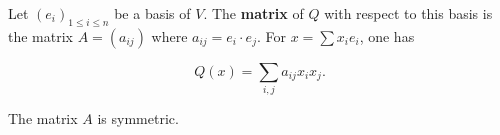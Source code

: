 Let $(e_i)_{1 \le i \le n}$ be a basis of $V$. The \textbf{matrix} of $Q$ with respect to this basis is the matrix $A = (a_{ij})$ where $a_{ij} = e_i \cdot e_j$. For $x = \sum x_i e_i$, one has

$$Q(x) = \sum_{i,j} a_{ij} x_i x_j.$$

The matrix $A$ is symmetric.
